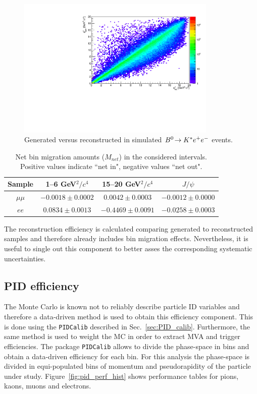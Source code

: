 \begin{figure}[h!]
\centering
\includegraphics[width=0.85\textwidth]{RKst/figs/bin_mig.pdf}
\caption{Generated versus reconstructed \qsq in simulated ${{B}^0}\!\rightarrow {\ensuremath{{K}^*}}e^+ e^-$ events.}
\label{fig:ee_bin_mig}
\end{figure}

\begin{table}[bh]
\centering
\caption{Net bin migration amounts ($M_{net}$) in the considered \qsq intervals.
Positive values indicate ``net in", negative values ``net out".}
\begin{tabular}{|c|c|c|c|}
\hline
 Sample 			& 1--6 GeV$^2/c^4$ 				& 15--20 GeV$^2/c^4$ 				& $J/\psi$  \\ \hline
$\mu\mu$ 	& $ -0.0018  \pm  0.0002 $ & $ 0.0042  \pm  0.0003 $ & $ -0.0012  \pm  0.0000 $ \\
$ee$ 	& $ 0.0834  \pm  0.0013 $ & $ -0.4469  \pm  0.0091 $ & $ -0.0258  \pm  0.0003 $ \\
\hline 
 \end{tabular}
 \label{tab:bin_mig}
\end{table}

The reconstruction efficiency is calculated comparing generated to reconstructed samples
and therefore already includes bin migration effects. Nevertheless, it is useful to single
out this component to better asses the corresponding systematic uncertainties.



\subsection{PID efficiency}
\label{sec:RKst_pid_eff}

The Monte Carlo is known not to reliably describe particle ID variables
and therefore a data-driven method is used to obtain this efficiency component.
This is done using the \verb!PIDCalib! described in Sec.~\ref{sec:PID_calib}.
Furthermore, the same method is used to weight the MC in order to extract MVA
and trigger efficiencies.
The package \verb!PIDCalib!  allows to divide the phase-space in bins and obtain a data-driven
efficiency for each bin. For this analysis the phase-space is divided in equi-populated bins of momentum
and pseudorapidity of the particle under study. Figure~\ref{fig:pid_perf_hist} shows performance
tables for pions, kaons, muons and electrons.

